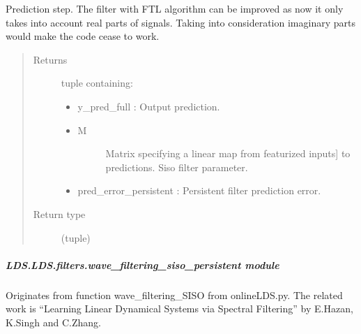 \documentclass[letterpaper,10pt,english]{sphinxmanual}
\begin{document}
\begin{fulllineitems}
\begin{fulllineitems}
\label{\detokenize{LDS.LDS.filters:LDS.LDS.filters.wave_filtering_siso_ftl_persistent.WaveFilteringSisoFtlPersistent.predict}}
\sphinxAtStartPar
Prediction step.
The filter with FTL algorithm can be improved as now it only takes into
account real parts of signals. Taking into consideration imaginary parts would make the
code cease to work.
\begin{quote}\begin{description}
\item[{Returns}] \leavevmode
\sphinxAtStartPar

\sphinxAtStartPar
tuple containing:
\begin{itemize}
\item {} 
\sphinxAtStartPar
y\_pred\_full           : Output prediction.

\item {} \begin{description}
\item[{M}] \leavevmode{[}Matrix specifying a linear map from featurized inputs{]}
\sphinxAtStartPar
to predictions. Siso filter parameter.

\end{description}

\item {} 
\sphinxAtStartPar
pred\_error\_persistent : Persistent filter prediction error.

\end{itemize}


\item[{Return type}] \leavevmode
\sphinxAtStartPar
(tuple)

\end{description}\end{quote}

\end{fulllineitems}


\end{fulllineitems}



\subparagraph{LDS.LDS.filters.wave\_filtering\_siso\_persistent module}
\label{\detokenize{LDS.LDS.filters:module-LDS.LDS.filters.wave_filtering_siso_persistent}}\label{\detokenize{LDS.LDS.filters:lds-lds-filters-wave-filtering-siso-persistent-module}}
\sphinxAtStartPar
Originates from function wave\_filtering\_SISO from onlineLDS.py.
The related work is “Learning Linear Dynamical Systems via Spectral Filtering”
by E.Hazan, K.Singh and C.Zhang.
\end{document}
